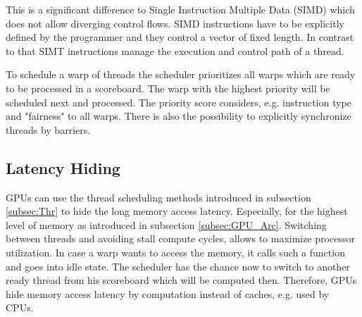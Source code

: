   This is a significant difference to Single Instruction Multiple Data (SIMD) which does not allow diverging control flows.
  SIMD instructions have to be explicitly defined by the programmer and they control a vector of fixed length.
  In contrast to that SIMT instructions manage the execution and control path of a thread.
  
  To schedule a warp of threads the scheduler prioritizes all warps which are ready to be processed in a scoreboard.
  The warp with the highest priority will be scheduled next and processed.
  The priority score considers, e.g. instruction type and "fairness" to all warps.
  There is also the possibility to explicitly synchronize threads by barriers.~\cite{Lindholm.2008}

         
\subsection{Latency Hiding}
  GPUs can use the thread scheduling methods introduced in subsection \ref{subsec:Thr} to hide the long memory access latency.
  Especially, for the highest level of memory as introduced in subsection \ref{subsec:GPU_Arc}.
  Switching between threads and avoiding stall compute cycles, allows to maximize processor utilization.
  In case a warp wants to access the memory, it calls such a function and goes into idle state.
  The scheduler has the chance now to switch to another ready thread from his scoreboard which will be computed then.
  Therefore, GPUs hide memory access latency by computation instead of caches, e.g. used by CPUs.~\cite{volkov.2016}~\cite{Rauber.2012}~\cite{NVIDIA.2019}
  
  
